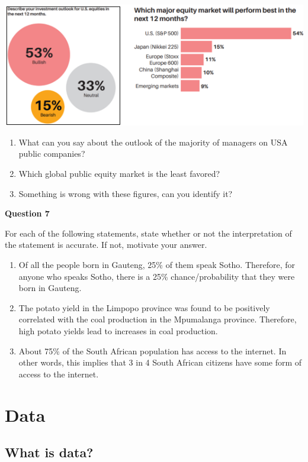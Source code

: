 \documentclass[
]{book}
\begin{document}
\includegraphics{images/Section 1 - 1.png}

\begin{enumerate}
\def\labelenumi{\alph{enumi}.}
\item
  What can you say about the outlook of the majority of managers on USA public companies?
\item
  Which global public equity market is the least favored?
\item
  Something is wrong with these figures, can you identify it?
\end{enumerate}

\textbf{Question 7}

For each of the following statements, state whether or not the interpretation of the statement is accurate. If not, motivate your answer.

\begin{enumerate}
\def\labelenumi{\alph{enumi}.}
\item
  Of all the people born in Gauteng, 25\% of them speak Sotho. Therefore, for anyone who speaks Sotho, there is a 25\% chance/probability that they were born in Gauteng.
\item
  The potato yield in the Limpopo province was found to be positively correlated with the coal production in the Mpumalanga province. Therefore, high potato yields lead to increases in coal production. ~
\item
  About 75\% of the South African population has access to the internet. In other words, this implies that 3 in 4 South African citizens have some form of access to the internet.
\end{enumerate}

\newpage

\section{Data}\label{data}

\subsection{What is data?}\label{what-is-data}
\end{document}
